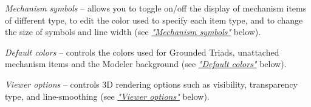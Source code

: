 \clearpage
\noindent
\begin{minipage}{0.6\textwidth}
  \raggedright
  \begin{bulletlist}
  \item{\sl Mechanism symbols} --
    allows you to toggle on/off the display of mechanism items
    of different type, to edit the color used to specify each item type,
    and to change the size of symbols and line width
    (see \protect\hyperlink{mechanism-symbols}{\sl"Mechanism symbols"} below).
  \item{\sl Default colors} --
    controls the colors used for Grounded Triads,
    unattached mechanism items and the Modeler background
    (see \protect\hyperlink{default-colors}{\sl"Default colors"} below).
  \item{\sl Viewer options} --
    controls 3D rendering options such as visibility, transparency type,
    and line-smoothing
    (see \protect\hyperlink{viewer-options}{\sl"Viewer options"} below).
  \end{bulletlist}
\end{minipage}%

